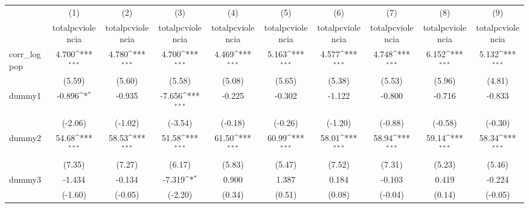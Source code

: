 {
\def\sym#1{\ifmmode^{#1}\else\(^{#1}\)\fi}
\begin{tabular}{l*{9}{c}}
\hline\hline
            &\multicolumn{1}{c}{(1)}&\multicolumn{1}{c}{(2)}&\multicolumn{1}{c}{(3)}&\multicolumn{1}{c}{(4)}&\multicolumn{1}{c}{(5)}&\multicolumn{1}{c}{(6)}&\multicolumn{1}{c}{(7)}&\multicolumn{1}{c}{(8)}&\multicolumn{1}{c}{(9)}\\
            &\multicolumn{1}{c}{totalpcviolencia}&\multicolumn{1}{c}{totalpcviolencia}&\multicolumn{1}{c}{totalpcviolencia}&\multicolumn{1}{c}{totalpcviolencia}&\multicolumn{1}{c}{totalpcviolencia}&\multicolumn{1}{c}{totalpcviolencia}&\multicolumn{1}{c}{totalpcviolencia}&\multicolumn{1}{c}{totalpcviolencia}&\multicolumn{1}{c}{totalpcviolencia}\\
\hline
corr\_logpop &       4.700\sym{***}&       4.780\sym{***}&       4.700\sym{***}&       4.469\sym{***}&       5.163\sym{***}&       4.577\sym{***}&       4.748\sym{***}&       6.152\sym{***}&       5.132\sym{***}\\
            &      (5.59)         &      (5.60)         &      (5.58)         &      (5.08)         &      (5.65)         &      (5.38)         &      (5.53)         &      (5.96)         &      (4.81)         \\
[1em]
dummy1      &      -0.896\sym{*}  &      -0.935         &      -7.656\sym{***}&      -0.225         &      -0.302         &      -1.122         &      -0.800         &      -0.716         &      -0.833         \\
            &     (-2.06)         &     (-1.02)         &     (-3.54)         &     (-0.18)         &     (-0.26)         &     (-1.20)         &     (-0.88)         &     (-0.58)         &     (-0.30)         \\
[1em]
dummy2      &       54.68\sym{***}&       58.53\sym{***}&       51.58\sym{***}&       61.50\sym{***}&       60.99\sym{***}&       58.01\sym{***}&       58.94\sym{***}&       59.14\sym{***}&       58.34\sym{***}\\
            &      (7.35)         &      (7.27)         &      (6.17)         &      (5.83)         &      (5.47)         &      (7.52)         &      (7.31)         &      (5.23)         &      (5.46)         \\
[1em]
dummy3      &      -1.434         &      -0.134         &      -7.319\sym{*}  &       0.900         &       1.387         &       0.184         &      -0.103         &       0.419         &      -0.224         \\
            &     (-1.60)         &     (-0.05)         &     (-2.20)         &      (0.34)         &      (0.51)         &      (0.08)         &     (-0.04)         &      (0.14)         &     (-0.05)         \\

\end{tabular}}
